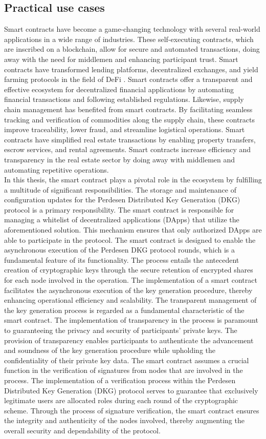 \documentclass[../../Main.tex]{subfiles}
\begin{document}
\subsection{Practical use cases}
Smart contracts have become a game-changing technology with several real-world applications in a wide range of industries. These self-executing contracts, which are inscribed on a blockchain, allow for secure and automated transactions, doing away with the need for middlemen and enhancing participant trust. Smart contracts have transformed lending platforms, decentralized exchanges, and yield farming protocols in the field of DeFi \cite{vanderveen2021defi}. Smart contracts offer a transparent and effective ecosystem for decentralized financial applications by automating financial transactions and following established regulations. Likewise, supply chain management has benefited from smart contracts. By facilitating seamless tracking and verification of commodities along the supply chain, these contracts improve traceability, lower fraud, and streamline logistical operations. Smart contracts have simplified real estate transactions by enabling property transfers, escrow services, and rental agreements. Smart contracts increase efficiency and transparency in the real estate sector by doing away with middlemen and automating repetitive operations. \\
\indent In this thesis, the smart contract plays a pivotal role in the ecosystem by fulfilling a multitude of significant responsibilities. The storage and maintenance of configuration updates for the Perdesen Distributed Key Generation (DKG) protocol is a primary responsibility. The smart contract is responsible for managing a whitelist of decentralized applications (DApps) that utilize the aforementioned solution. This mechanism ensures that only authorized DApps are able to participate in the protocol. The smart contract is designed to enable the asynchronous execution of the Perdesen DKG protocol rounds, which is a fundamental feature of its functionality. The process entails the antecedent creation of cryptographic keys through the secure retention of encrypted shares for each node involved in the operation.  The implementation of a smart contract facilitates the asynchronous execution of the key generation procedure, thereby enhancing operational efficiency and scalability. The transparent management of the key generation process is regarded as a fundamental characteristic of the smart contract. The implementation of transparency in the process is paramount to guaranteeing the privacy and security of participants' private keys. The provision of transparency enables participants to authenticate the advancement and soundness of the key generation procedure while upholding the confidentiality of their private key data. The smart contract assumes a crucial function in the verification of signatures from nodes that are involved in the process. The implementation of a verification process within the Perdesen Distributed Key Generation (DKG) protocol serves to guarantee that exclusively legitimate users are allocated roles during each round of the cryptographic scheme. Through the process of signature verification, the smart contract ensures the integrity and authenticity of the nodes involved, thereby augmenting the overall security and dependability of the protocol.
\end{document}
